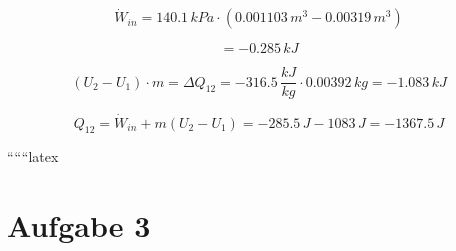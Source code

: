 \begin{equation*}
\dot{W}_{in} = 140.1 \, kPa \cdot (0.001103 \, m^3 - 0.00319 \, m^3)
\end{equation*}

\begin{equation*}
= -0.285 \, kJ
\end{equation*}

\begin{equation*}
(U_2 - U_1) \cdot m = \Delta Q_{12} = -316.5 \, \frac{kJ}{kg} \cdot 0.00392 \, kg = -1.083 \, kJ
\end{equation*}

\begin{equation*}
Q_{12} = \dot{W}_{in} + m (U_2 - U_1) = -285.5 \, J - 1083 \, J = -1367.5 \, J
\end{equation*}

``````latex


\section*{Aufgabe 3}